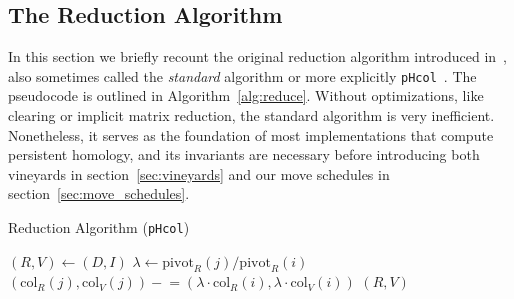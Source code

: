\documentclass{siamart190516}
\begin{document}
\subsection{The Reduction Algorithm}\label{sec:reduction}
In this section we briefly recount the original reduction algorithm introduced in~\cite{zomorodian2005computing}, also sometimes called the \emph{standard} algorithm or more explicitly \texttt{pHcol}~\cite{de2011dualities}. 
The pseudocode is outlined in Algorithm~\ref{alg:reduce}. Without optimizations, like   clearing   or       implicit matrix reduction, the standard  algorithm is very inefficient. Nonetheless, it serves as the foundation of most implementations that compute persistent homology, and its invariants are necessary before introducing both vineyards in section~\ref{sec:vineyards} and our move schedules  in section~\ref{sec:move_schedules}.

\begin{algorithm}[t]
	\caption{Reduction Algorithm (\texttt{pHcol}) }
	\begin{algorithmic}[1]
		\State $(R, V) \gets (D, I)$
				\State $\lambda \gets \mathrm{pivot}_R(j)/\mathrm{pivot}_R(i)$
				\State $(\mathrm{col}_R(j), \mathrm{col}_V(j)) \mathrel{-}= \left ( \lambda \cdot \mathrm{col}_R(i), \lambda \cdot \mathrm{col}_V(i) \right )$
			\EndWhile
		\EndFor 
		\State \Return $(R, V)$
		\EndFunction
	\end{algorithmic}	\label{alg:reduce}
\end{algorithm}
\end{document}

